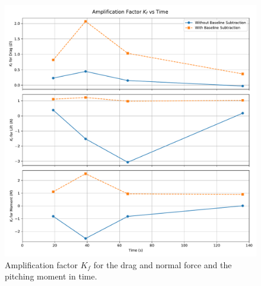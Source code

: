 \documentclass[12pt]{article}
\begin{document}
\begin{figure}[H]
    \centering
    \includegraphics[width=1.0\linewidth]{figs/amplification_factors_vs_Time.pdf}
    \caption{Amplification factor $K_f$ for the drag and normal force and the pitching moment in time.}
    \label{fig:Kf}
\end{figure}

\end{document}
